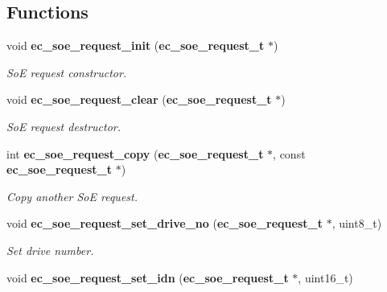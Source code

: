 \subsection*{Functions}
\begin{DoxyCompactItemize}
\item 
void {\bf ec\-\_\-soe\-\_\-request\-\_\-init} ({\bf ec\-\_\-soe\-\_\-request\-\_\-t} $\ast$)\label{soe__request_8h_a153a97cf0b6f06a25566bced679a548f}

\begin{DoxyCompactList}\small\item\em So\-E request constructor. \end{DoxyCompactList}\item 
void {\bf ec\-\_\-soe\-\_\-request\-\_\-clear} ({\bf ec\-\_\-soe\-\_\-request\-\_\-t} $\ast$)\label{soe__request_8h_a62db42f000afec347cb9abeef113e06c}

\begin{DoxyCompactList}\small\item\em So\-E request destructor. \end{DoxyCompactList}\item 
int {\bf ec\-\_\-soe\-\_\-request\-\_\-copy} ({\bf ec\-\_\-soe\-\_\-request\-\_\-t} $\ast$, const {\bf ec\-\_\-soe\-\_\-request\-\_\-t} $\ast$)
\begin{DoxyCompactList}\small\item\em Copy another So\-E request. \end{DoxyCompactList}\item 
void {\bf ec\-\_\-soe\-\_\-request\-\_\-set\-\_\-drive\-\_\-no} ({\bf ec\-\_\-soe\-\_\-request\-\_\-t} $\ast$, uint8\-\_\-t)\label{soe__request_8h_a31de21e8095a24e03eb4a5e5662f7d66}

\begin{DoxyCompactList}\small\item\em Set drive number. \end{DoxyCompactList}\item 
void {\bf ec\-\_\-soe\-\_\-request\-\_\-set\-\_\-idn} ({\bf ec\-\_\-soe\-\_\-request\-\_\-t} $\ast$, uint16\-\_\-t)\label{soe__request_8h_a4779a40d4914431cfe445423ae85ff31}


\end{DoxyCompactItemize}
